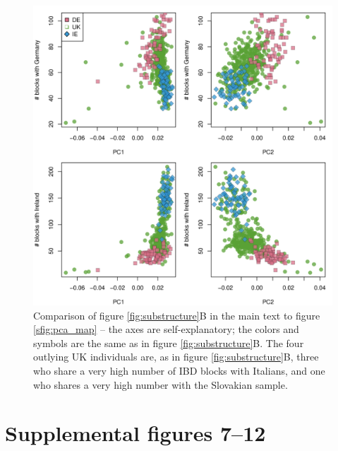 \documentclass{article}
\begin{document}
\begin{figure}[!htp]
  \begin{center}
    \includegraphics{UK_PCA_vs_IBD}
    \caption{
    Comparison of figure \ref{fig:substructure}B in the main text to figure \ref{sfig:pca_map} --
    the axes are self-explanatory; the colors and symbols are the same as in figure \ref{fig:substructure}B.
    The four outlying UK individuals are, as in figure \ref{fig:substructure}B, 
    three who share a very high number of IBD blocks with Italians,
    and one who shares a very high number with the Slovakian sample.
    \label{sfig:pca_ibd_uk}
    }
  \end{center}
\end{figure}

\section*{Supplemental figures 7--12}
\end{document}
